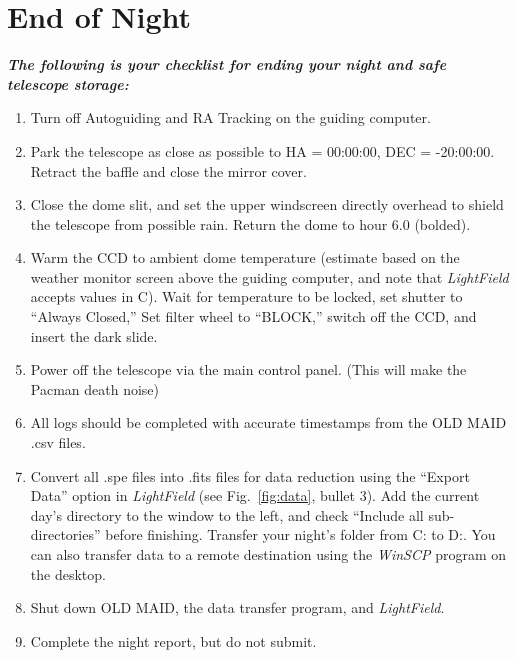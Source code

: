 \documentclass[12pt]{article}
\begin{document}
\section{End of Night}\label{end}
\textit{\textbf{The following is your checklist for ending your night and safe telescope storage:}}
\begin{enumerate}
   \item Turn off Autoguiding and RA Tracking on the guiding computer.
   \item Park the telescope as close as possible to HA = 00:00:00, DEC = -20:00:00. Retract the baffle and close the mirror cover.
   \item Close the dome slit, and set the upper windscreen directly overhead to shield the telescope from possible rain. Return the dome to hour 6.0 (bolded).
   \item Warm the CCD to ambient dome temperature (estimate based on the weather monitor screen above the guiding computer, and note that \textit{LightField} accepts values in \textdegree C). Wait for temperature to be locked, set shutter to ``Always Closed,'' Set filter wheel to ``BLOCK,'' switch off the CCD, and insert the dark slide.
   \item Power off the telescope via the main control panel. (This will make the Pacman death noise)
   \item All logs should be completed with accurate timestamps from the OLD MAID .csv files.
   \item Convert all .spe files into .fits files for data reduction using the ``Export Data'' option in \textit{LightField} (see Fig.~\ref{fig:data}, bullet 3). Add the current day's directory to the window to the left, and check ``Include all sub-directories'' before finishing. Transfer your night's folder from C: to D:. You can also transfer data to a remote destination using the \textit{WinSCP} program on the desktop.
   \item Shut down OLD MAID, the data transfer program, and \textit{LightField}.
   \item Complete the night report, but do not submit.
\end{enumerate}

\hfill \\
\end{document}
